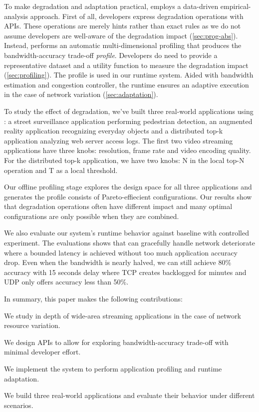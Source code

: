 To make degradation and adaptation practical, \sysname{} employs a data-driven
empirical-analysis approach. First of all, developers express degradation
operations with \sysname{} APIs. These operations are merely hints rather than
exact rules as we do not assume developers are well-aware of the degradation
impact (\autoref{sec:prog-abs}). Instead, \sysname{} performs an automatic
multi-dimensional profiling that produces the bandwidth-accuracy trade-off
\textit{profile}. Developers do need to provide a representative dataset and a
utility function to measure the degradation impact
(\autoref{sec:profiling}). The profile is used in our runtime system. Aided with
bandwidth estimation and congestion controller, the runtime ensures an adaptive
execution in the case of network variation (\autoref{sec:adaptation}).

To study the effect of degradation, we've built three real-world applications
using \sysname{}: a street surveillance application performing pedestrian
detection, an augmented reality application recognizing everyday objects and a
distributed top-k application analyzing web server access logs. The first two
video streaming applications have three knobs: resolution, frame rate and video
encoding quality. For the distributed top-k application, we have two knobs: N in
the local top-N operation and T as a local threshold.

Our offline profiling stage explores the design space for all three applications
and generates the profile consists of Pareto-effiecient configurations. Our
results show that degradation operations often have different impact and many
optimal configurations are only possible when they are combined.

We also evaluate our system's runtime behavior against baseline with controlled
experiment. The evaluations shows that \sysname{} can gracefully handle network
deteriorate where a bounded latency is achieved without too much application
accuracy drop. Even when the bandwidth is nearly halved, we can still achieve
80\% accuracy with 15 seconds delay where TCP creates backlogged for minutes and
UDP only offers accuracy less than 50\%.

In summary, this paper makes the following contributions:

\squishlist    %
\item We study in depth of wide-area streaming applications in the case of
  network resource variation.
\item We design APIs to allow for exploring bandwidth-accuracy trade-off with
  minimal developer effort.
\item We implement the system to perform application profiling and runtime
  adaptation.
\item We build three real-world applications and evaluate their behavior
  under different scenarios.
\squishend %

